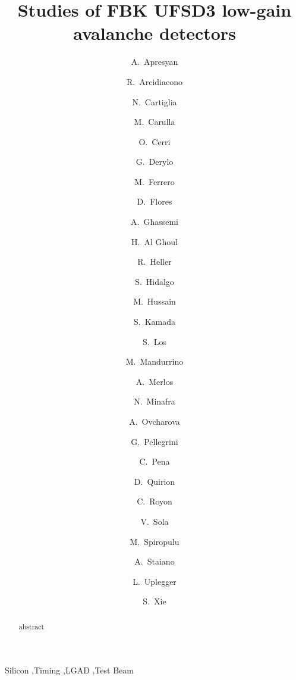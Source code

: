 \documentclass[preprint,1p]{elsarticle}
\begin{document}
\linenumbers

\begin{frontmatter}



\title{Studies of FBK UFSD3 low-gain avalanche detectors}


\author[1]{A.~Apresyan}
\author[5,7]{R.~Arcidiacono}
\author[5]{N.~Cartiglia}
\author[8]{M.~Carulla}
\author[2]{O.~Cerri}
\author[1]{G.~Derylo}
\author[5]{M.~Ferrero}
\author[8]{D.~Flores}
\author[9]{A.~Ghassemi}
\author[3]{H.~Al Ghoul}
\author[1]{R.~Heller}
\author[8]{S.~Hidalgo}
\author[1]{M.~Hussain}
\author[9]{S.~Kamada}
\author[1]{S.~Los}
\author[5]{M.~Mandurrino}
\author[8]{A.~Merlos}
\author[3]{N.~Minafra}
\author[4]{A.~Ovcharova}
\author[8]{G.~Pellegrini}
\author[1,2]{C.~Pena}
\author[8]{D.~Quirion}
\author[3]{C.~Royon}
\author[5]{V.~Sola}
\author[2]{M.~Spiropulu}
\author[5]{A.~Staiano}
\author[1]{L.~Uplegger}
\author[2]{S.~Xie}

\address[1]{Fermi National Accelerator Laboratory, Batavia, IL, USA}
\address[2]{California Institute of Technology, Pasadena, CA, USA}
\address[3]{University of Kansas, KS, USA}
\address[4]{University of California Santa Barabara, CA, USA}
\address[5]{INFN, Torino, Italy}
\address[6]{Universit\`a di Torino, Torino, Italy}
\address[7]{Universit\`a del Piemonte Orientale, Italy}
\address[8]{Centro Nacional de Microelectr\'{o}nica (IMB-CNM-CSIC), Barcelona, Spain}

\begin{abstract}
abstract
\end{abstract}

\begin{keyword}

Silicon \sep Timing \sep LGAD \sep Test Beam

\end{keyword}

\end{frontmatter}
\end{document}
